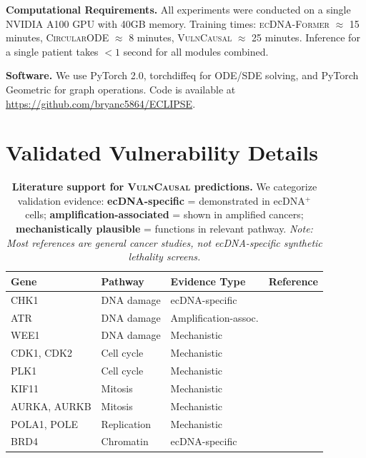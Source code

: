 \documentclass{article}
\newcommand{\former}{\textsc{ecDNA-Former}}
\newcommand{\circularode}{\textsc{CircularODE}}
\newcommand{\vulncausal}{\textsc{VulnCausal}}
\begin{document}
\textbf{Computational Requirements.} All experiments were conducted on a single NVIDIA A100 GPU with 40GB memory. Training times: \former{} $\approx$ 15 minutes, \circularode{} $\approx$ 8 minutes, \vulncausal{} $\approx$ 25 minutes. Inference for a single patient takes $<1$ second for all modules combined.

\textbf{Software.} We use PyTorch 2.0, torchdiffeq for ODE/SDE solving, and PyTorch Geometric for graph operations. Code is available at \url{https://github.com/bryanc5864/ECLIPSE}.


\section{Validated Vulnerability Details}
\label{app:vulnerabilities}

\begin{table}[ht]
\caption{\textbf{Literature support for \vulncausal{} predictions.} We categorize validation evidence: \textbf{ecDNA-specific} = demonstrated in ecDNA$^+$ cells; \textbf{amplification-associated} = shown in amplified cancers; \textbf{mechanistically plausible} = functions in relevant pathway. \textit{Note: Most references are general cancer studies, not ecDNA-specific synthetic lethality screens.}}
\label{tab:vuln_full}
\centering
\small
\begin{tabular}{@{}llll@{}}
\toprule
Gene & Pathway & Evidence Type & Reference \\
\midrule
CHK1 & DNA damage & ecDNA-specific & \citet{yi_2024_chk1_ecdna} \\
ATR & DNA damage & Amplification-assoc. & \citet{shen_2019_atr} \\
WEE1 & DNA damage & Mechanistic & \citet{otto_2017_cell_cycle} \\
CDK1, CDK2 & Cell cycle & Mechanistic & \citet{otto_2017_cell_cycle} \\
PLK1 & Cell cycle & Mechanistic & \citet{gutteridge_2016_plk1} \\
KIF11 & Mitosis & Mechanistic & \citet{zhou_2019_kif11} \\
AURKA, AURKB & Mitosis & Mechanistic & \citet{wilkinson_2007_aurkb} \\
POLA1, POLE & Replication & Mechanistic & \citet{macheret_2020_replication} \\
BRD4 & Chromatin & ecDNA-specific & \citet{hung_2021_ecdna_hubs} \\
\bottomrule
\end{tabular}
\end{table}
\end{document}
